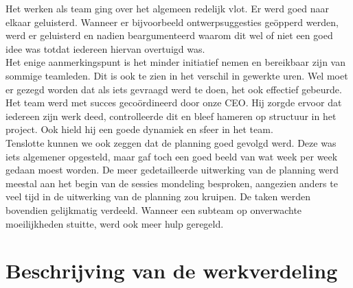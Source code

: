 \documentclass[]{penoverslag}
\begin{document}
Het werken als team ging over het algemeen redelijk vlot. Er werd goed naar elkaar geluisterd. Wanneer er bijvoorbeeld ontwerpsuggesties ge\"opperd werden, werd er geluisterd en nadien beargumenteerd waarom dit wel of niet een goed idee was totdat iedereen hiervan overtuigd was.
\\ 
Het enige aanmerkingspunt is het minder initiatief nemen en bereikbaar zijn van sommige teamleden. Dit is ook te zien in het verschil in gewerkte uren. Wel moet er gezegd worden dat als iets gevraagd werd te doen, het ook effectief gebeurde.
\\
Het team werd met succes geco\"ordineerd door onze CEO. Hij zorgde ervoor dat iedereen zijn werk deed, controlleerde dit en bleef hameren op structuur in het project. Ook hield hij een goede dynamiek en sfeer in het team.
\\
Tenslotte kunnen we ook zeggen dat de planning goed gevolgd werd. Deze was iets algemener opgesteld, maar gaf toch een goed beeld van wat week per week gedaan moest worden. De meer gedetailleerde uitwerking van de planning werd meestal aan het begin van de sessies mondeling besproken, aangezien anders te veel tijd in de uitwerking van de planning zou kruipen. De taken werden bovendien gelijkmatig verdeeld. Wanneer een subteam op onverwachte moeilijkheden stuitte, werd ook meer hulp geregeld.

\section{Beschrijving van de werkverdeling}
\end{document}
